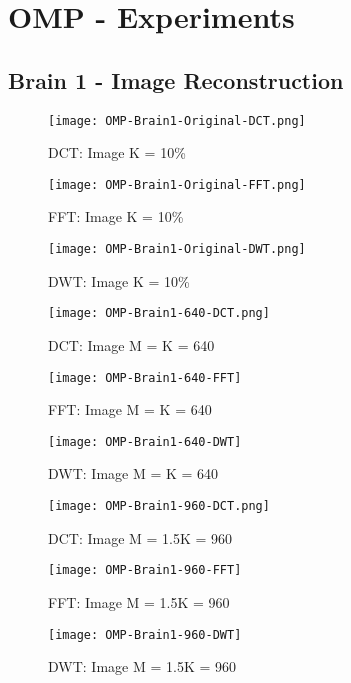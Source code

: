 \documentclass[titlepage,oneside, 12pt]{book}
\theoremstyle{break}
\begin{document}
\clearpage

\section{OMP - Experiments}

\subsection{Brain 1 - Image Reconstruction}

\begin{figure}[!h]
\centering
{}
  \texttt{[image: OMP-Brain1-Original-DCT.png]}
  \caption{DCT: Image K = 10\%}\label{fig:OMP-Brain1-Original-DCT}
\endminipage
\hspace*{2em}
  \texttt{[image: OMP-Brain1-Original-FFT.png]}
  \caption{FFT: Image K = 10\%}\label{fig:OMP-Brain1-Original-FFT}
\endminipage
\hspace*{2em}
%
  \texttt{[image: OMP-Brain1-Original-DWT.png]}
  \caption{DWT: Image K = 10\%}\label{fig:OMP-Brain1-Original-DWT}
\endminipage
\hspace*{2em}
\end{figure}

\begin{figure}[!h]
\centering
{}
  \texttt{[image: OMP-Brain1-640-DCT.png]}
  \caption{DCT: Image M = K = 640}\label{fig:OMP-Brain1-640-DCT}
\endminipage
\hspace*{2em}
  \texttt{[image: OMP-Brain1-640-FFT]}
  \caption{FFT: Image M = K = 640}\label{fig:OMP-Brain1-640-FFT}
\endminipage
\hspace*{2em}
%
  \texttt{[image: OMP-Brain1-640-DWT]}
  \caption{DWT: Image M = K = 640}\label{fig:OMP-Brain1-640-DWT}
\endminipage
\hspace*{2em}
\end{figure}

\begin{figure}[!h]
\centering
{}
  \texttt{[image: OMP-Brain1-960-DCT.png]}
  \caption{DCT: Image M = 1.5K = 960}\label{fig:OMP-Brain1-960-DCT}
\endminipage
\hspace*{2em}
  \texttt{[image: OMP-Brain1-960-FFT]}
  \caption{FFT: Image M = 1.5K = 960}\label{fig:OMP-Brain1-960-FFT}
\endminipage
\hspace*{2em}
%
  \texttt{[image: OMP-Brain1-960-DWT]}
  \caption{DWT: Image M = 1.5K = 960}\label{fig:OMP-Brain1-960-DWT}
\endminipage
\hspace*{2em}
\end{figure}
\end{document}
